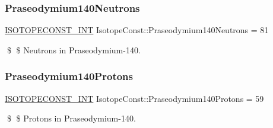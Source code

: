 \subsubsection{\texorpdfstring{Praseodymium140\+Neutrons}{Praseodymium140Neutrons}}
{\footnotesize\ttfamily \mbox{\hyperlink{group___isotope_const-_macros_ga5f18360b3e99483a35c32d789e62621c}{I\+S\+O\+T\+O\+P\+E\+C\+O\+N\+S\+T\+\_\+\+I\+NT}} Isotope\+Const\+::\+Praseodymium140\+Neutrons = 81}

\$ \$ Neutrons in Praseodymium-\/140. \mbox{\label{group___isotope_const-_praseodymium-_pr140_ga1e38747501b15468798e998cad97dc90}} 
\subsubsection{\texorpdfstring{Praseodymium140\+Protons}{Praseodymium140Protons}}
{\footnotesize\ttfamily \mbox{\hyperlink{group___isotope_const-_macros_ga5f18360b3e99483a35c32d789e62621c}{I\+S\+O\+T\+O\+P\+E\+C\+O\+N\+S\+T\+\_\+\+I\+NT}} Isotope\+Const\+::\+Praseodymium140\+Protons = 59}

\$ \$ Protons in Praseodymium-\/140. 